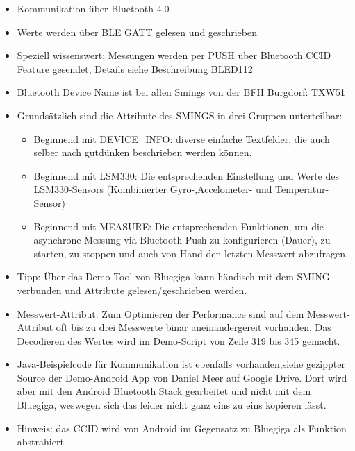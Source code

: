 \begin{itemize}
	\itemsep 1pt \parskip 0pt \parsep 0pt
	\item Kommunikation über Bluetooth 4.0
	\item Werte werden über BLE GATT gelesen und geschrieben 
	\item Speziell wissenswert: Messungen werden per PUSH über Bluetooth CCID Feature gesendet, Details siehe Beschreibung BLED112
	\item Bluetooth Device Name ist bei allen Smings von der BFH Burgdorf:  TXW51
	\item Grundsätzlich sind die Attribute des SMINGS in drei Gruppen unterteilbar:
	\begin{itemize}
		\itemsep 1pt \parskip 0pt \parsep 0pt
		\item Beginnend mit \url{DEVICE_INFO}: diverse einfache Textfelder, die auch selber nach gutdünken beschrieben werden können.
		\item Beginnend mit LSM330: Die entsprechenden Einstellung und Werte des LSM330-Sensors (Kombinierter Gyro-,Accelometer- und Temperatur-Sensor)
		\item Beginnend mit MEASURE: Die entsprechenden Funktionen, um die asynchrone Messung via Bluetooth Push zu konfigurieren (Dauer), zu starten, zu stoppen und auch von Hand den letzten Messwert abzufragen.
		
	\end{itemize}
	\item Tipp: Über das Demo-Tool von Bluegiga kann händisch mit dem SMING verbunden und Attribute gelesen/geschrieben werden.
	
	\item Messwert-Attribut: Zum Optimieren der Performance sind auf dem Messwert-Attribut oft bis zu drei Messwerte binär aneinandergereit vorhanden. Das Decodieren des Wertes wird im Demo-Script von Zeile 319 bis 345 gemacht.
	
	\item Java-Beispielcode für Kommunikation ist ebenfalls vorhanden,siehe gezippter Source der Demo-Android App von Daniel Meer auf Google Drive. Dort wird aber mit den Android Bluetooth Stack gearbeitet und nicht mit dem Bluegiga, weswegen sich das leider nicht ganz eins zu eins kopieren lässt. 
	
	\item Hinweis: das CCID wird von Android im Gegensatz zu Bluegiga als Funktion abstrahiert.
\end{itemize}

